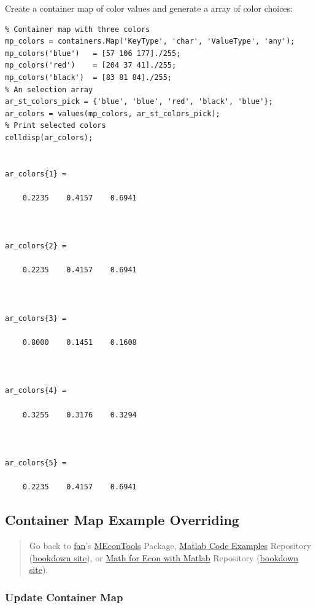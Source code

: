 \documentclass[
]{book}
\begin{document}
Create a container map of color values and generate a array of color
choices:

\begin{verbatim}
% Container map with three colors
mp_colors = containers.Map('KeyType', 'char', 'ValueType', 'any');
mp_colors('blue')   = [57 106 177]./255;
mp_colors('red')    = [204 37 41]./255;
mp_colors('black')  = [83 81 84]./255;
% An selection array
ar_st_colors_pick = {'blue', 'blue', 'red', 'black', 'blue'};
ar_colors = values(mp_colors, ar_st_colors_pick);
% Print selected colors
celldisp(ar_colors);


ar_colors{1} =
 
    0.2235    0.4157    0.6941



ar_colors{2} =
 
    0.2235    0.4157    0.6941



ar_colors{3} =
 
    0.8000    0.1451    0.1608



ar_colors{4} =
 
    0.3255    0.3176    0.3294



ar_colors{5} =
 
    0.2235    0.4157    0.6941
\end{verbatim}

\hypertarget{container-map-example-overriding}{%
\subsection{Container Map Example Overriding}\label{container-map-example-overriding}}

\begin{quote}
Go back to \href{http://fanwangecon.github.io/}{fan}'s \href{https://fanwangecon.github.io/MEconTools/}{MEconTools} Package, \href{https://fanwangecon.github.io/M4Econ/}{Matlab Code Examples} Repository (\href{https://fanwangecon.github.io/M4Econ/bookdown}{bookdown site}), or \href{https://fanwangecon.github.io/Math4Econ/}{Math for Econ with Matlab} Repository (\href{https://fanwangecon.github.io/Math4Econ/bookdown}{bookdown site}).
\end{quote}

\hypertarget{update-container-map}{%
\subsubsection{Update Container Map}\label{update-container-map}}
\end{document}
